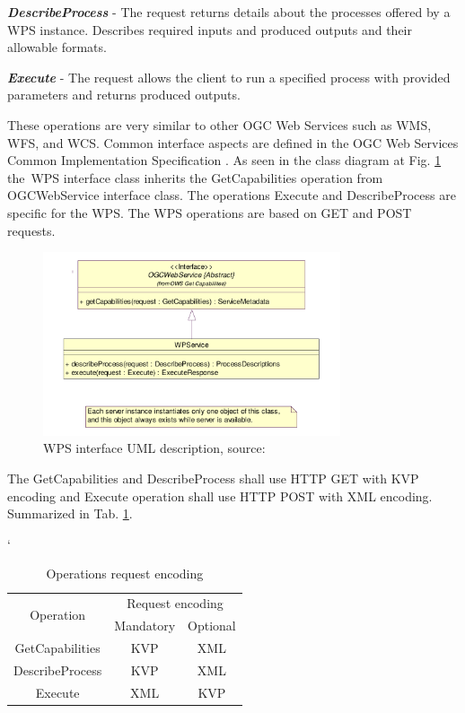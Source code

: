 \textbf{\textit{DescribeProcess}} - The request returns details about the processes offered by a WPS instance. Describes
required inputs and produced outputs and their allowable formats.

\textbf{\textit{Execute}} - The request allows the client to run a specified process with provided parameters and returns
produced outputs.

\newpage
These operations are very similar to other OGC Web Services such as WMS, WFS, and WCS. Common interface aspects
are defined in the OGC Web Services Common Implementation Specification \cite{OGC_common}. As seen in 
the class diagram at Fig. \ref{fig:WPS_class_diagram} the~WPS interface class inherits the GetCapabilities operation 
from OGCWebService interface class. The operations Execute and DescribeProcess are specific for the WPS. The WPS
operations are based on GET and POST requests.

\begin{figure}[h!]
\centering
\includegraphics[width=0.78\textwidth]{img/WPS_class_diagram.png}
\caption{WPS interface UML description, source: \cite{WPS_standart_1.0}}
\label{fig:WPS_class_diagram}
\end{figure}

The GetCapabilities and DescribeProcess shall use HTTP GET with KVP encoding and Execute operation shall use HTTP
POST with XML encoding. Summarized in Tab. \ref{tab:WPS_encoding}.
\begin{table}[h!]
\catcode`
\centering
\begin{tabular}{|c|c|c|}
\hline
\multirow{2}{*}{Operation} & \multicolumn{2}{c|}{Request encoding} \\ \cline{2-3} 
                           & Mandatory          & Optional         \\ \hhline{|=|=|=|}
GetCapabilities            & KVP                & XML              \\ \hline
DescribeProcess            & KVP                & XML              \\ \hline
Execute                    & XML                & KVP              \\ \hline
\end{tabular}
\caption{Operations request encoding}
\label{tab:WPS_encoding}
\end{table}

